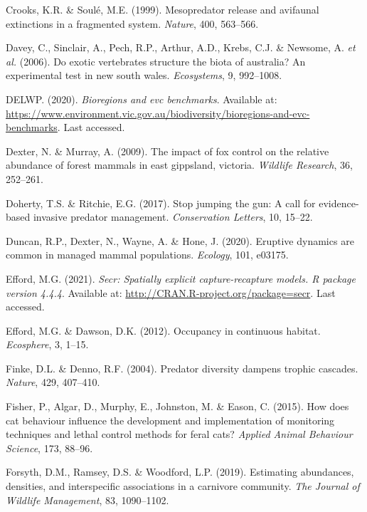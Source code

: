 \documentclass[]{elsarticle} %
\begin{document}
\leavevmode\hypertarget{ref-crooks1999}{}%
Crooks, K.R. \& Soulé, M.E. (1999). Mesopredator release and avifaunal extinctions in a fragmented system. \emph{Nature}, 400, 563--566.

\leavevmode\hypertarget{ref-davey2006}{}%
Davey, C., Sinclair, A., Pech, R.P., Arthur, A.D., Krebs, C.J. \& Newsome, A. \emph{et al.} (2006). Do exotic vertebrates structure the biota of australia? An experimental test in new south wales. \emph{Ecosystems}, 9, 992--1008.

\leavevmode\hypertarget{ref-delwp2020}{}%
DELWP. (2020). \emph{Bioregions and evc benchmarks}. Available at: \url{https://www.environment.vic.gov.au/biodiversity/bioregions-and-evc-benchmarks}. Last accessed.

\leavevmode\hypertarget{ref-dexter2009impact}{}%
Dexter, N. \& Murray, A. (2009). The impact of fox control on the relative abundance of forest mammals in east gippsland, victoria. \emph{Wildlife Research}, 36, 252--261.

\leavevmode\hypertarget{ref-doherty2017}{}%
Doherty, T.S. \& Ritchie, E.G. (2017). Stop jumping the gun: A call for evidence-based invasive predator management. \emph{Conservation Letters}, 10, 15--22.

\leavevmode\hypertarget{ref-duncan2020eruptive}{}%
Duncan, R.P., Dexter, N., Wayne, A. \& Hone, J. (2020). Eruptive dynamics are common in managed mammal populations. \emph{Ecology}, 101, e03175.

\leavevmode\hypertarget{ref-efford2021secr}{}%
Efford, M.G. (2021). \emph{Secr: Spatially explicit capture-recapture models. R package version 4.4.4}. Available at: \url{http://CRAN.R-project.org/package=secr}. Last accessed.

\leavevmode\hypertarget{ref-efford2012}{}%
Efford, M.G. \& Dawson, D.K. (2012). Occupancy in continuous habitat. \emph{Ecosphere}, 3, 1--15.

\leavevmode\hypertarget{ref-finke2004}{}%
Finke, D.L. \& Denno, R.F. (2004). Predator diversity dampens trophic cascades. \emph{Nature}, 429, 407--410.

\leavevmode\hypertarget{ref-fisher2015}{}%
Fisher, P., Algar, D., Murphy, E., Johnston, M. \& Eason, C. (2015). How does cat behaviour influence the development and implementation of monitoring techniques and lethal control methods for feral cats? \emph{Applied Animal Behaviour Science}, 173, 88--96.

\leavevmode\hypertarget{ref-forsyth2019}{}%
Forsyth, D.M., Ramsey, D.S. \& Woodford, L.P. (2019). Estimating abundances, densities, and interspecific associations in a carnivore community. \emph{The Journal of Wildlife Management}, 83, 1090--1102.
\end{document}
